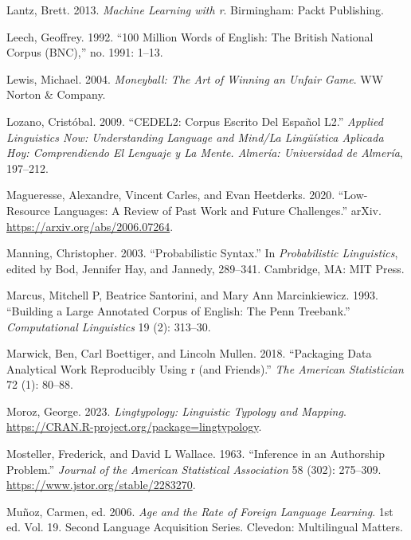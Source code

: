 \documentclass[
  letterpaper,
  DIV=11,
  numbers=noendperiod]{scrreport}
\newlength{\cslhangindent}
\newlength{\cslentryspacingunit} %
\newenvironment{CSLReferences}[2] %
 {%
  \setlength{\parindent}{0pt}
  \ifodd #1
  \let\oldpar\par
  \def\par{\hangindent=\cslhangindent\oldpar}
  \fi
  \setlength{\parskip}{#2\cslentryspacingunit}
 }%
 {}
\theoremstyle{definition}
\theoremstyle{remark}
\begin{document}
\begin{CSLReferences}{1}{0}
\leavevmode{}%
Lantz, Brett. 2013. \emph{Machine Learning with r}. Birmingham: Packt
Publishing.

\leavevmode{}%
Leech, Geoffrey. 1992. {``100 Million Words of English: The British
National Corpus (BNC),''} no. 1991: 1--13.

\leavevmode{}%
Lewis, Michael. 2004. \emph{Moneyball: The Art of Winning an Unfair
Game}. WW Norton \& Company.

\leavevmode{}%
Lozano, Cristóbal. 2009. {``CEDEL2: Corpus Escrito Del Español L2.''}
\emph{Applied Linguistics Now: Understanding Language and Mind/La
Lingüística Aplicada Hoy: Comprendiendo El Lenguaje y La Mente. Almería:
Universidad de Almería}, 197--212.

\leavevmode{}%
Magueresse, Alexandre, Vincent Carles, and Evan Heetderks. 2020.
{``Low-Resource Languages: A Review of Past Work and Future
Challenges.''} arXiv. \url{https://arxiv.org/abs/2006.07264}.

\leavevmode{}%
Manning, Christopher. 2003. {``Probabilistic Syntax.''} In
\emph{Probabilistic Linguistics}, edited by Bod, Jennifer Hay, and
Jannedy, 289--341. Cambridge, MA: MIT Press.

\leavevmode{}%
Marcus, Mitchell P, Beatrice Santorini, and Mary Ann Marcinkiewicz.
1993. {``Building a Large Annotated Corpus of English: The Penn
Treebank.''} \emph{Computational Linguistics} 19 (2): 313--30.

\leavevmode{}%
Marwick, Ben, Carl Boettiger, and Lincoln Mullen. 2018. {``Packaging
Data Analytical Work Reproducibly Using r (and Friends).''} \emph{The
American Statistician} 72 (1): 80--88.

\leavevmode{}%
Moroz, George. 2023. \emph{Lingtypology: Linguistic Typology and
Mapping}. \url{https://CRAN.R-project.org/package=lingtypology}.

\leavevmode{}%
Mosteller, Frederick, and David L Wallace. 1963. {``Inference in an
Authorship Problem.''} \emph{Journal of the American Statistical
Association} 58 (302): 275--309.
\url{https://www.jstor.org/stable/2283270}.

\leavevmode{}%
Muñoz, Carmen, ed. 2006. \emph{Age and the Rate of Foreign Language
Learning}. 1st ed. Vol. 19. Second Language Acquisition Series.
Clevedon: Multilingual Matters.


\end{CSLReferences}
\end{document}
